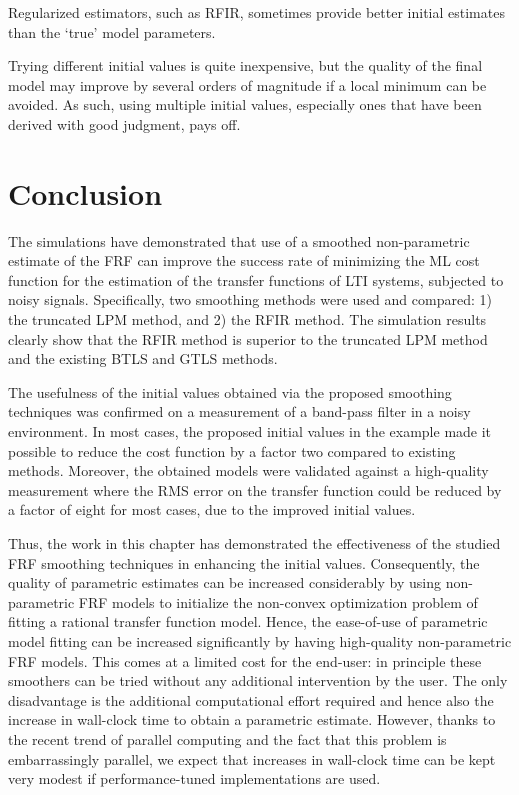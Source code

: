 \begin{guideline}
\label{guide:initvals:try-regularization}
Regularized estimators, such as \gls{RFIR}, sometimes provide better initial estimates than the `true' model parameters.
\end{guideline}

\begin{guideline}
\label{guide:initvals:try-many-initial-values}
Trying different initial values is quite inexpensive, but the quality of the final model may improve by several orders of magnitude if a local minimum can be avoided.
As such, using multiple initial values, especially ones that have been derived with good judgment, pays off.
\end{guideline}

\section{Conclusion}\label{sec:initial-values:Conclusion}
The simulations have demonstrated that use of a smoothed non-parametric estimate of the \gls{FRF} can improve the success rate of minimizing the \gls{ML} cost function for the estimation of the transfer functions of \gls{LTI} systems, subjected to noisy signals. Specifically, two smoothing methods were used and compared: 1) the truncated \gls{LPM} method, and 2) the \gls{RFIR} method. The simulation results clearly show that the \gls{RFIR} method is superior to the truncated \gls{LPM} method and the existing \gls{BTLS} and \gls{GTLS} methods.

The usefulness of the initial values obtained via the proposed smoothing techniques was confirmed on a measurement of a band-pass filter in a noisy environment.
In most cases, the proposed initial values in the example made it possible to reduce the cost function by a factor two compared to existing methods.
Moreover, the obtained models were validated against a high-quality measurement where the \gls{RMS} error on the transfer function could be reduced by a factor of eight for most cases, due to the improved initial values.

Thus, the work in this chapter has demonstrated the effectiveness of the studied \gls{FRF} smoothing techniques in enhancing the initial values.
Consequently, the quality of parametric estimates can be increased considerably by using non-parametric \gls{FRF} models to initialize the non-convex optimization problem of fitting a rational transfer function model.
Hence, the ease-of-use of parametric model fitting can be increased significantly by having high-quality non-parametric \gls{FRF} models.
This comes at a limited cost for the end-user: in principle these smoothers can be tried without any additional intervention by the user.
The only disadvantage is the additional computational effort required and hence also the increase in wall-clock time to obtain a parametric estimate.
However, thanks to the recent trend of parallel computing and the fact that this problem is embarrassingly parallel, we expect that increases in wall-clock time can be kept very modest if performance-tuned implementations are used.

